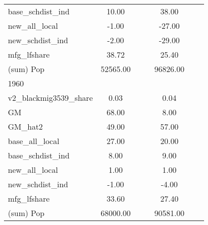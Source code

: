 \begin{table}[htbp]
\begin{tabular}{l*{2}{ccc}}
base\_schdist\_ind    &       10.00&            &            &       38.00&            &            \\
new\_all\_local       &       -1.00&            &            &      -27.00&            &            \\
new\_schdist\_ind     &       -2.00&            &            &      -29.00&            &            \\
mfg\_lfshare         &       38.72&            &            &       25.40&            &            \\
(sum) Pop           &    52565.00&            &            &    96826.00&            &            \\
\midrule
1960                &            &            &            &            &            &            \\
v2\_blackmig3539\_share&        0.03&            &            &        0.04&            &            \\
GM                  &       68.00&            &            &        8.00&            &            \\
GM\_hat2             &       49.00&            &            &       57.00&            &            \\
base\_all\_local      &       27.00&            &            &       20.00&            &            \\
base\_schdist\_ind    &        8.00&            &            &        9.00&            &            \\
new\_all\_local       &        1.00&            &            &        1.00&            &            \\
new\_schdist\_ind     &       -1.00&            &            &       -4.00&            &            \\
mfg\_lfshare         &       33.60&            &            &       27.40&            &            \\
(sum) Pop           &    68000.00&            &            &    90581.00&            &            \\
\bottomrule
\end{tabular}
\end{table}
